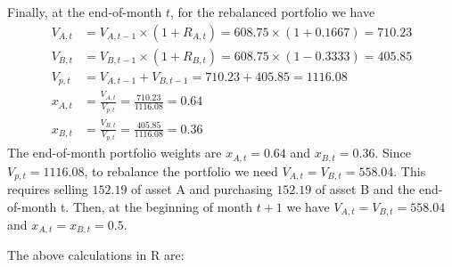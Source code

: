 \documentclass[
  letterpaper,
  DIV=11,
  numbers=noendperiod]{scrreprt}
\theoremstyle{definition}
\theoremstyle{definition}
\theoremstyle{remark}
\begin{document}
Finally, at the end-of-month \(t\), for the rebalanced portfolio we have
\begin{align}
V_{A,t} &= V_{A,t-1}\times (1 + R_{A,t}) = 608.75 \times (1 + 0.1667) = 710.23 \\
V_{B,t} &= V_{B,t-1}\times (1 + R_{B,t}) = 608.75 \times (1 - 0.3333) = 405.85 \\
V_{p,t} &= V_{A,t-1} + V_{B,t-1} = 710.23 + 405.85 = 1116.08 \\
x_{A,t} &= \frac{V_{A,t}}{V_{p,t}} = \frac{710.23}{1116.08} = 0.64 \\
x_{B,t} &= \frac{V_{B,t}}{V_{p,t}} = \frac{405.85}{1116.08} = 0.36 
\end{align} The end-of-month portfolio weights are \(x_{A,t} = 0.64\)
and \(x_{B,t} = 0.36\). Since \(V_{p,t} = 1116.08\), to rebalance the
portfolio we need \(V_{A,t} = V_{B,t} = 558.04\). This requires selling
\(152.19\) of asset A and purchasing \(152.19\) of asset B and the
end-of-month t. Then, at the beginning of month \(t+1\) we have
\(V_{A,t} = V_{B,t} = 558.04\) and \(x_{A,t} = x_{B,t} = 0.5\).

The above calculations in R are:
\end{document}
